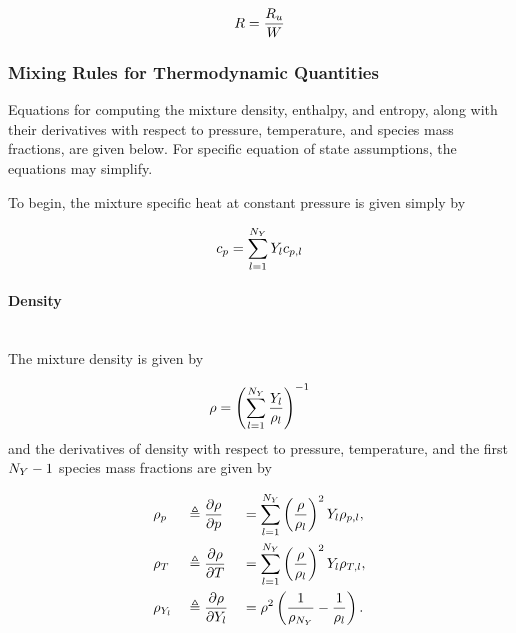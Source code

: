 \begin{equation}
	R = \frac{R_u}{W}
\end{equation}

\subsubsection{Mixing Rules for Thermodynamic Quantities}

Equations for computing the mixture density, enthalpy, and entropy, along with their derivatives with respect to pressure, temperature, and species mass fractions, are given below. For specific equation of state assumptions, the equations may simplify.

To begin, the mixture specific heat at constant pressure is given simply by

\begin{equation}
	c_{p} = \sum_{l = 1}^{N_Y} Y_{l} c_{p,l}
\end{equation}

\paragraph{Density} ~\\

The mixture density is given by

\begin{equation}
	\rho = \left( \sum_{l = 1}^{N_Y} \frac{Y_{l}}{\rho_{l}} \right)^{-1}	
\end{equation}
and the derivatives of density with respect to pressure, temperature, and the first $N_Y - 1$ species mass fractions are given by

\begin{alignat}{3}
    &\rho_p &&\triangleq \frac{\partial \rho}{\partial p} &&= \sum_{l = 1}^{N_Y} \left( \frac{\rho}{\rho_{l}} \right)^2 Y_{l} \rho_{p, l}, \\
    &\rho_T &&\triangleq \frac{\partial \rho}{\partial T} &&= \sum_{l = 1}^{N_Y} \left( \frac{\rho}{\rho_{l}} \right)^2 Y_{l} \rho_{T, l}, \\
    &\rho_{Y_{l}} &&\triangleq \frac{\partial \rho}{\partial Y_{l}} &&= \rho^2 \left( \frac{1}{\rho_{N_Y}} - \frac{1}{\rho_{l}} \right).
\end{alignat}


